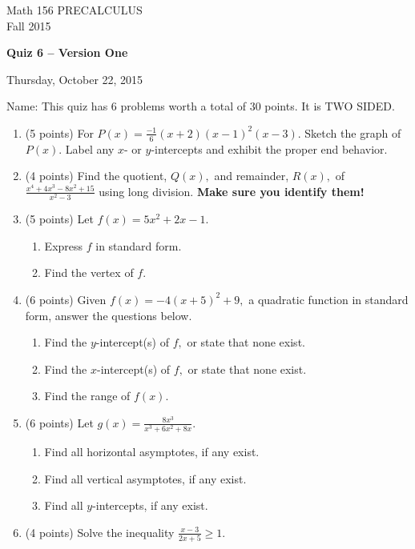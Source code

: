 \documentclass[11pt]{article}
\begin{document}
\begin{center}
\vspace{2in}

\huge{Math 156 PRECALCULUS \\
Fall 2015}

\vfill

\huge{\bf{Quiz 6 -- Version One}}\\

\vspace{0.5in}

\large{Thursday, October 22, 2015}\\

\vfill


{\huge{Name:{\underline{\hspace{2in}}}}}
\vfill
This quiz has 6 problems worth a total of 30 points. It is TWO SIDED. 
\vfill
\end{center}
\newpage
\restoregeometry
\begin{enumerate}
\item (5 points) For $P(x)=\frac{-1}{6}(x+2)(x-1)^2(x-3).$ Sketch the graph of $P(x).$ Label any $x$- or $y$-intercepts and exhibit the proper end behavior.
\vspace{2in}
\vfill
\item (4 points) Find the quotient, $Q(x),$ and remainder, $R(x),$ of $\frac{x^4+4x^3-8x^2+15}{x^2-3}$ using long division. {\bf{Make sure you identify them!}}
\vfill
\newpage
\item (5 points) Let $f(x)=5x^2+2x-1.$
\begin{enumerate}
\item Express $f$ in standard form.
\vspace{1.5in}
\item Find the vertex of $f.$
\vspace{0.5in}
\end{enumerate}
\item (6 points) Given $f(x)=-4(x+5)^2+9,$ a quadratic function in standard form, answer the questions below.
\begin{enumerate}
\item Find the $y$-intercept(s) of $f,$ or state that none exist.
\vfill
\item Find the $x$-intercept(s) of $f,$ or state that none exist.
\vfill
\item Find the range of $f(x).$
\vfill
\end{enumerate}
\newpage

\item (6 points) Let $g(x)=\frac{8x^3}{x^3+6x^2+8x}.$
\begin{enumerate}
\item Find all horizontal asymptotes, if any exist.
\vfill
\item Find all vertical asymptotes, if any exist.
\vfill
\item Find all $y$-intercepts, if any exist.
\vfill
\end{enumerate}
\item (4 points) Solve the inequality $\frac{x-3}{2x+5}\geq 1.$
\vspace{3in}
\end{enumerate}
\end{document}
